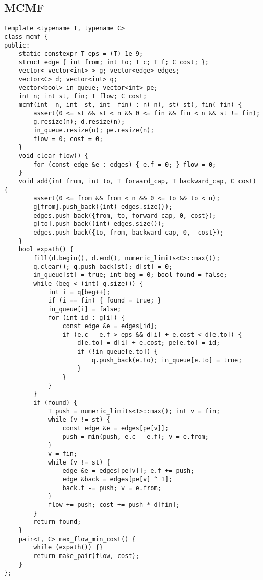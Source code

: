 \documentclass[landscape, 8pt, a4paper, oneside]{extarticle}
\begin{document}
\begin{multicols}{3}
\subsection{MCMF}
\begin{verbatim}
template <typename T, typename C>
class mcmf {
public:
    static constexpr T eps = (T) 1e-9;
    struct edge { int from; int to; T c; T f; C cost; };
    vector< vector<int> > g; vector<edge> edges;
    vector<C> d; vector<int> q;
    vector<bool> in_queue; vector<int> pe;
    int n; int st, fin; T flow; C cost;
    mcmf(int _n, int _st, int _fin) : n(_n), st(_st), fin(_fin) {
        assert(0 <= st && st < n && 0 <= fin && fin < n && st != fin);
        g.resize(n); d.resize(n);
        in_queue.resize(n); pe.resize(n);
        flow = 0; cost = 0;
    }
    void clear_flow() {
        for (const edge &e : edges) { e.f = 0; } flow = 0;
    }
    void add(int from, int to, T forward_cap, T backward_cap, C cost) {
        assert(0 <= from && from < n && 0 <= to && to < n);
        g[from].push_back((int) edges.size());
        edges.push_back({from, to, forward_cap, 0, cost});
        g[to].push_back((int) edges.size());
        edges.push_back({to, from, backward_cap, 0, -cost});
    }
    bool expath() {
        fill(d.begin(), d.end(), numeric_limits<C>::max());
        q.clear(); q.push_back(st); d[st] = 0;
        in_queue[st] = true; int beg = 0; bool found = false;
        while (beg < (int) q.size()) {
            int i = q[beg++];
            if (i == fin) { found = true; }
            in_queue[i] = false;
            for (int id : g[i]) {
                const edge &e = edges[id];
                if (e.c - e.f > eps && d[i] + e.cost < d[e.to]) {
                    d[e.to] = d[i] + e.cost; pe[e.to] = id;
                    if (!in_queue[e.to]) {
                        q.push_back(e.to); in_queue[e.to] = true;
                    }
                }
            }
        }
        if (found) {
            T push = numeric_limits<T>::max(); int v = fin;
            while (v != st) {
                const edge &e = edges[pe[v]];
                push = min(push, e.c - e.f); v = e.from;
            }
            v = fin;
            while (v != st) {
                edge &e = edges[pe[v]]; e.f += push;
                edge &back = edges[pe[v] ^ 1];
                back.f -= push; v = e.from;
            }
            flow += push; cost += push * d[fin];
        }
        return found;
    }
    pair<T, C> max_flow_min_cost() {
        while (expath()) {}
        return make_pair(flow, cost);
    }
};
\end{verbatim}

\end{multicols}
\end{document}
